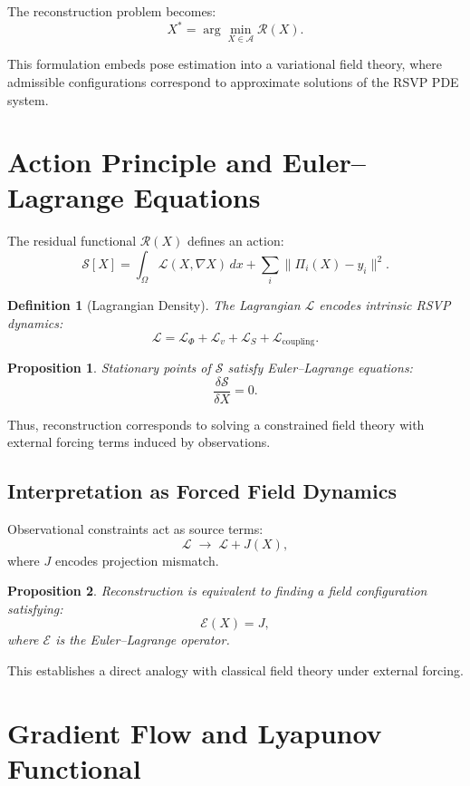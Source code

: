 \documentclass[12pt]{article}
\newtheorem{definition}{Definition}
\newtheorem{proposition}{Proposition}
\begin{document}
The reconstruction problem becomes:
\[
X^* = \arg\min_{X \in \mathcal{A}} \mathcal{R}(X).
\]

This formulation embeds pose estimation into a variational field theory, where admissible configurations correspond to approximate solutions of the RSVP PDE system.

\section{Action Principle and Euler--Lagrange Equations}

The residual functional $\mathcal{R}(X)$ defines an action:
\[
\mathcal{S}[X] = \int_{\Omega} \mathcal{L}(X, \nabla X)\, dx + \sum_i \|\Pi_i(X) - y_i\|^2.
\]

\begin{definition}[Lagrangian Density]
The Lagrangian $\mathcal{L}$ encodes intrinsic RSVP dynamics:
\[
\mathcal{L} = \mathcal{L}_\Phi + \mathcal{L}_v + \mathcal{L}_S + \mathcal{L}_{\mathrm{coupling}}.
\]
\end{definition}

\begin{proposition}
Stationary points of $\mathcal{S}$ satisfy Euler--Lagrange equations:
\[
\frac{\delta \mathcal{S}}{\delta X} = 0.
\]
\end{proposition}

Thus, reconstruction corresponds to solving a constrained field theory with external forcing terms induced by observations.

\subsection{Interpretation as Forced Field Dynamics}

Observational constraints act as source terms:
\[
\mathcal{L} \;\to\; \mathcal{L} + J(X),
\]
where $J$ encodes projection mismatch.

\begin{proposition}
Reconstruction is equivalent to finding a field configuration satisfying:
\[
\mathcal{E}(X) = J,
\]
where $\mathcal{E}$ is the Euler--Lagrange operator.
\end{proposition}

This establishes a direct analogy with classical field theory under external forcing.

\section{Gradient Flow and Lyapunov Functional}
\end{document}
